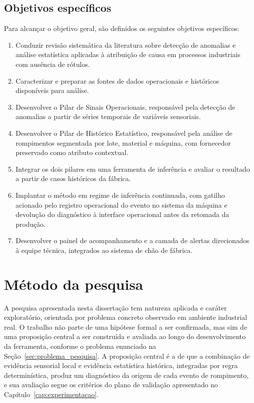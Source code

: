 \subsection{Objetivos específicos}
\label{subsec:objetivos_especificos}

Para alcançar o objetivo geral, são definidos os seguintes objetivos específicos:
\begin{enumerate}
    \item Conduzir revisão sistemática da literatura sobre detecção de anomalias e análise estatística aplicadas à atribuição de causa em processos industriais com ausência de rótulos.
    \item Caracterizar e preparar as fontes de dados operacionais e históricos disponíveis para análise.
    \item Desenvolver o Pilar de Sinais Operacionais, responsável pela detecção de anomalias a partir de séries temporais de variáveis sensoriais.
    \item Desenvolver o Pilar de Histórico Estatístico, responsável pela análise de rompimentos segmentada por lote, material e máquina, com fornecedor preservado como atributo contextual.
    \item Integrar os dois pilares em uma ferramenta de inferência e avaliar o resultado a partir de casos históricos da fábrica.
    \item Implantar o método em regime de inferência continuada, com gatilho acionado pelo registro operacional do evento no sistema da máquina e devolução do diagnóstico à interface operacional antes da retomada da produção.
    \item Desenvolver o painel de acompanhamento e a camada de alertas direcionados à equipe técnica, integrados ao sistema de chão de fábrica.
\end{enumerate}


\section{Método da pesquisa}
\label{sec:caracterizacao_pesquisa}

A pesquisa apresentada nesta dissertação tem natureza aplicada e caráter exploratório, orientada por problema concreto observado em ambiente industrial real. O trabalho não parte de uma hipótese formal a ser confirmada, mas sim de uma proposição central a ser construída e avaliada ao longo do desenvolvimento da ferramenta, conforme o problema enunciado na Seção~\ref{sec:problema_pesquisa}. A proposição central é a de que a combinação de evidência sensorial local e evidência estatística histórica, integradas por regra determinística, produz um diagnóstico da origem de cada evento de rompimento, e sua avaliação segue os critérios do plano de validação apresentado no Capítulo~\ref{cap:experimentacao}.

